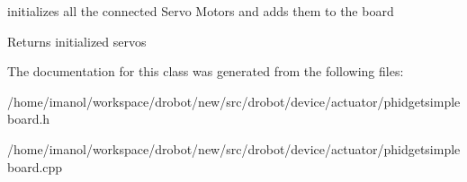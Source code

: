 initializes all the connected Servo Motors and adds them to the board 

\begin{DoxyReturn}{Returns}
initialized servos 
\end{DoxyReturn}


The documentation for this class was generated from the following files\-:\begin{DoxyCompactItemize}
\item 
/home/imanol/workspace/drobot/new/src/drobot/device/actuator/phidgetsimpleboard.\-h\item 
/home/imanol/workspace/drobot/new/src/drobot/device/actuator/phidgetsimpleboard.\-cpp\end{DoxyCompactItemize}
